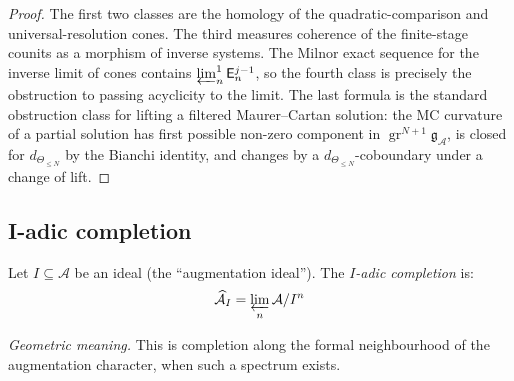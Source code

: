 \begin{proof}
The first two classes are the homology of the quadratic-comparison and
universal-resolution cones.  The third measures coherence of the
finite-stage counits as a morphism of inverse systems.  The Milnor
exact sequence for the inverse limit of cones contains
$\varprojlim^1_n\mathsf E_n^{j-1}$, so the fourth class is precisely
the obstruction to passing acyclicity to the limit. The last formula is
the standard obstruction class for lifting a filtered Maurer--Cartan
solution: the MC curvature of a partial solution has first possible
non-zero component in
$\operatorname{gr}^{N+1}\mathfrak g_{\mathcal A}$, is closed for
$d_{\Theta_{\le N}}$ by the Bianchi identity, and changes by a
$d_{\Theta_{\le N}}$-coboundary under a change of lift.
\end{proof}

\subsection{I-adic completion}

\begin{definition}\label{def:i-adic-completion}
Let $I \subseteq \mathcal{A}$ be an ideal (the ``augmentation ideal''). The
\emph{$I$-adic completion} is:
\[\widehat{\mathcal{A}}_I = \varprojlim_n \mathcal{A} / I^n\]

\emph{Geometric meaning.} This is completion along the formal
neighbourhood of the augmentation character, when such a spectrum
exists.
\end{definition}

